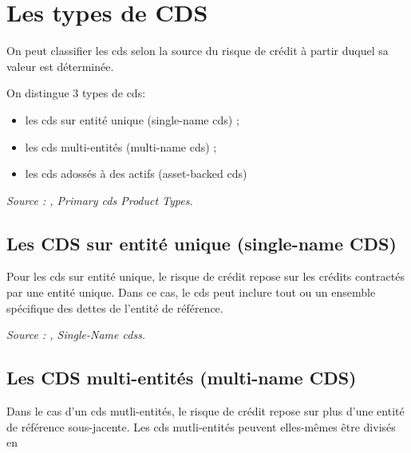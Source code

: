 \section{Les types de CDS}

On peut classifier les \gls{cds} selon la source du risque de crédit à partir duquel sa valeur est déterminée.

On distingue 3 types de \gls{cds}:
\begin{itemize}
    \item les \gls{cds} sur entité unique (single-name \gls{cds}) ;
    \item les \gls{cds} multi-entités (multi-name \gls{cds}) ;
    \item les \gls{cds} adossés à des actifs (asset-backed \gls{cds})
\end{itemize}

\noindent\textit{Source : \cite{credit_default_swap}, Primary \gls{cds} Product Types.}

\subsection{Les CDS sur entité unique (single-name CDS)}
Pour les \gls{cds} sur entité unique, le risque de crédit repose sur les crédits contractés par une entité unique. Dans ce cas, le \gls{cds} peut inclure tout ou un ensemble spécifique des dettes de l'entité de référence.

\noindent\textit{Source : \cite{credit_default_swap}, Single-Name \gls{cds}s.}

\subsection{Les CDS multi-entités (multi-name CDS)}

Dans le cas d'un \gls{cds} mutli-entités, le risque de crédit repose sur plus d'une entité de référence sous-jacente. Les \gls{cds} mutli-entités peuvent elles-mêmes être divisés en 


